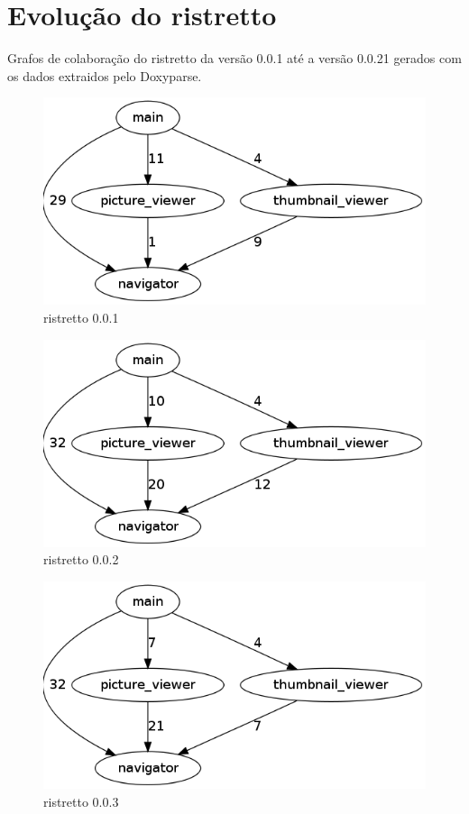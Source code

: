 \chapter{Evolução do ristretto} \label{ch:evolucao}

Grafos de colaboração do ristretto da versão 0.0.1 até a versão 0.0.21 gerados
com os dados extraidos pelo Doxyparse.

\begin{figure}[h]
\center
\includegraphics[scale=0.4]{imagens/ristretto-0_0_1-doxyparse-2}
\caption{ristretto 0.0.1}
\label{fig:ristretto-0.0.1-doxyparse-2-anexo}
\end{figure}

\begin{figure}[h]
\center
\includegraphics[scale=0.4]{imagens/ristretto-0_0_2-doxyparse-2}
\caption{ristretto 0.0.2}
\label{fig:ristretto-0.0.2-doxyparse-2-anexo}
\end{figure}

\begin{figure}[h]
\center
\includegraphics[scale=0.4]{imagens/ristretto-0_0_3-doxyparse-2}
\caption{ristretto 0.0.3}
\label{fig:ristretto-0.0.3-doxyparse-2-anexo}
\end{figure}

